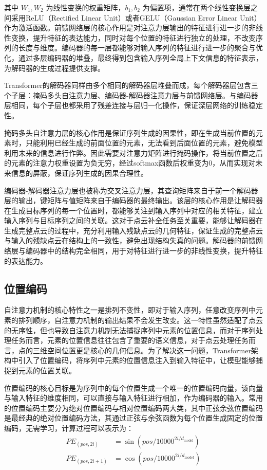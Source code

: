 其中 $W_1, W_2$ 为线性变换的权重矩阵，$b_1, b_2$ 为偏置项，通常在两个线性变换层之间采用ReLU（Rectified Linear Unit）或者GELU（Gaussian Error Linear Unit）作为激活函数。前馈网络层的核心作用是对注意力层输出的特征进行进一步的非线性变换，提升特征的表达能力，同时对每个位置的特征进行独立的处理，不改变序列的长度与维度。编码器的每一层都能够对输入序列的特征进行进一步的聚合与优化，通过多层编码器的堆叠，最终得到包含输入序列全局上下文信息的特征表示，为解码器的生成过程提供支撑。

Transformer的解码器同样由多个相同的解码器层堆叠而成，每个解码器层包含三个子层：掩码多头自注意力层、编码器-解码器注意力层与前馈网络层。与编码器层相同，每个子层也都采用了残差连接与层归一化操作，保证深层网络的训练稳定性。

掩码多头自注意力层的核心作用是保证序列生成的因果性，即在生成当前位置的元素时，只能利用已经生成的前面位置的元素，无法看到后面位置的元素，避免模型利用未来的信息进行作弊。因此需要对注意力矩阵进行掩码操作，将当前位置之后的元素的注意力权重设置为负无穷，经过softmax函数后权重变为0，从而实现对未来信息的屏蔽，保证序列生成的因果合理性。

编码器-解码器注意力层也被称为交叉注意力层，其查询矩阵来自于前一个解码器层的输出，键矩阵与值矩阵来自于编码器的最终输出。该层的核心作用是让解码器在生成目标序列的每一个位置时，都能够关注到输入序列中对应的相关特征，建立输入序列与目标序列之间的关联。这对于点云补全任务至关重要，能够让解码器在生成完整点云的过程中，充分利用输入残缺点云的几何特征，保证生成的完整点云与输入的残缺点云在结构上的一致性，避免出现结构失真的问题。解码器的前馈网络层与编码器中的结构完全相同，用于对特征进行进一步的非线性变换，提升特征的表达能力。

\subsection{位置编码}
自注意力机制的核心特性之一是排列不变性，即对于输入序列，任意改变序列中元素的排列顺序，自注意力机制的输出结果不会发生改变。这一特性虽然适配了点云的无序性，但也导致自注意力机制无法捕捉序列中元素的位置信息，而对于序列处理任务而言，元素的位置信息往往包含了重要的语义信息，对于点云处理任务而言，点的三维空间位置更是核心的几何信息。为了解决这一问题，Transformer架构中引入了位置编码，将序列中元素的位置信息注入到输入特征中，让模型能够捕捉到元素的位置关联。

位置编码的核心目标是为序列中的每个位置生成一个唯一的位置编码向量，该向量与输入特征的维度相同，可以直接与输入特征进行相加，作为编码器的输入。常用的位置编码主要分为绝对位置编码与相对位置编码两大类，其中正弦余弦位置编码是最经典的绝对位置编码方法，其通过正弦与余弦函数为每个位置生成固定的位置编码，无需学习，计算过程可以表示为：
\begin{equation}
\begin{split}
PE_{(pos, 2i)} &= \sin\left( pos / 10000^{2i / d_{\text{model}}} \right) \\
PE_{(pos, 2i+1)} &= \cos\left( pos / 10000^{2i / d_{\text{model}}} \right)
\end{split}
\end{equation}

